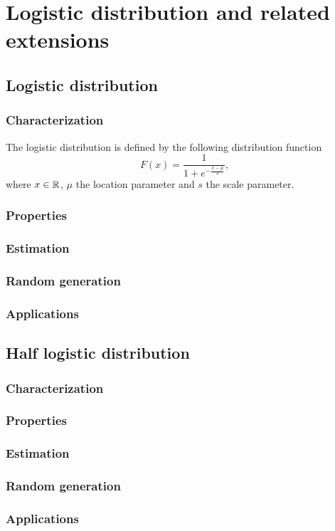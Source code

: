 \chapter{Logistic distribution and related extensions}
\section{Logistic distribution}
\subsection{Characterization}
The logistic distribution is defined by the following distribution function
$$
F(x) = \frac{1}{1+e^{-\frac{x-\mu}{s}}},
$$
where $x\in\mathbb R$, $\mu$ the location parameter and $s$ the scale parameter.

\subsection{Properties}
\subsection{Estimation}
\subsection{Random generation}
\subsection{Applications}

\section{Half logistic distribution}
\subsection{Characterization}
\subsection{Properties}
\subsection{Estimation}
\subsection{Random generation}
\subsection{Applications}

